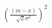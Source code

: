 \documentclass[preview]{standalone}
\begin{document}
\begin{align*}
(\frac{(m - x)}{\sqrt{2} \sigma^2})^2
\end{align*}
\end{document}
